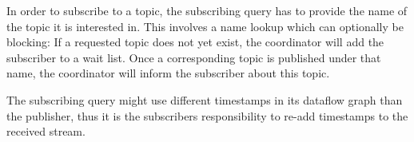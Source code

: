 In order to subscribe to a topic, the subscribing query has to provide the name
of the topic it is interested in. This involves a name lookup which can optionally
be blocking: If a requested topic does not yet exist, the coordinator will add
the subscriber to a wait list. Once a corresponding topic is published under that
name, the coordinator will inform the subscriber about this topic. 

The subscribing query might use different timestamps in its dataflow graph
than the publisher, thus it is the subscribers responsibility to re-add
timestamps to the received stream. 




